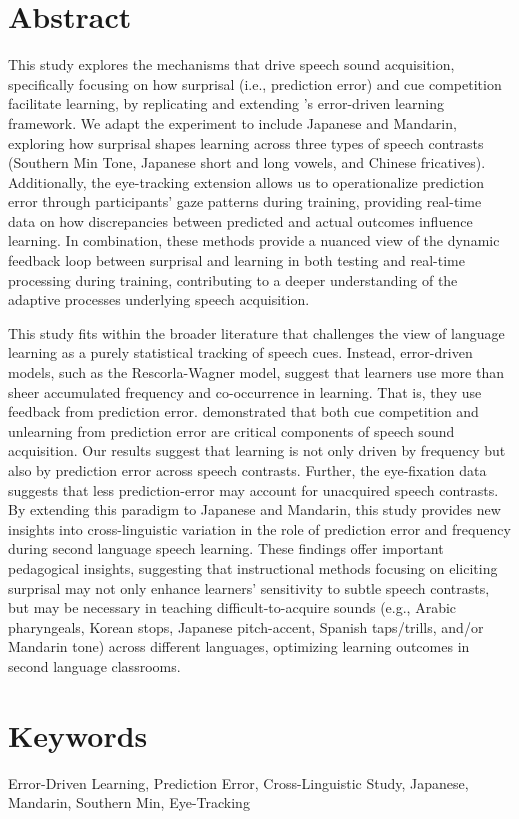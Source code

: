 \section{Abstract}

This study explores the mechanisms that drive speech sound acquisition, specifically focusing on how surprisal (i.e., prediction error) and cue competition facilitate learning, by replicating and extending \textcite{nixon2020mice}'s error-driven learning framework. We adapt the experiment to include Japanese and Mandarin, exploring how surprisal shapes learning across three types of speech contrasts (Southern Min Tone, Japanese short and long vowels, and Chinese fricatives). Additionally, the eye-tracking extension allows us to operationalize prediction error through participants’ gaze patterns during training, providing real-time data on how discrepancies between predicted and actual outcomes influence learning. In combination, these methods provide a nuanced view of the dynamic feedback loop between surprisal and learning in both testing and real-time processing during training, contributing to a deeper understanding of the adaptive processes underlying speech acquisition.

This study fits within the broader literature that challenges the view of language learning as a purely statistical tracking of speech cues. Instead, error-driven models, such as the Rescorla-Wagner model, suggest that learners use more than sheer accumulated frequency and co-occurrence in learning. That is, they use feedback from prediction error. \textcite{nixon2020mice} demonstrated that both cue competition and unlearning from prediction error are critical components of speech sound acquisition. Our results suggest that learning is not only driven by frequency but also by prediction error across speech contrasts. Further, the eye-fixation data suggests that less prediction-error may account for unacquired speech contrasts. By extending this paradigm to Japanese and Mandarin, this study provides new insights into cross-linguistic variation in the role of prediction error and frequency during second language speech learning. These findings offer important pedagogical insights, suggesting that instructional methods focusing on eliciting surprisal may not only enhance learners’ sensitivity to subtle speech contrasts, but may be necessary in teaching difficult-to-acquire sounds (e.g., Arabic pharyngeals, Korean stops, Japanese pitch-accent, Spanish taps/trills, and/or Mandarin tone) across different languages, optimizing learning outcomes in second language classrooms.

\section{Keywords}
Error-Driven Learning, Prediction Error, Cross-Linguistic Study, Japanese, Mandarin, Southern Min, Eye-Tracking
\newpage


